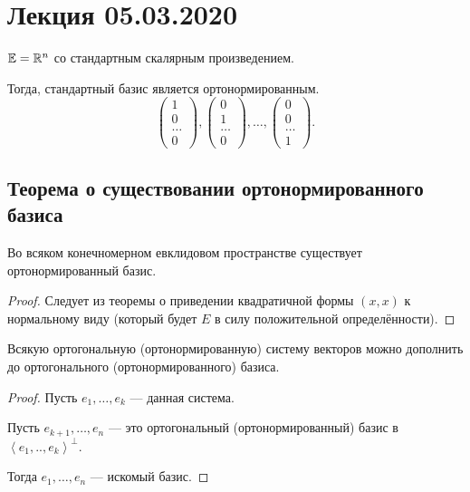 \section{Лекция 05.03.2020}

\begin{example}
    $\mathbb{E} = \mathbb{R}^n$ со стандартным скалярным произведением.

    Тогда, стандартный базис является ортонормированным.
    \begin{equation*}
        \begin{pmatrix} 1 \\ 0 \\ \dots \\ 0 \end{pmatrix},
        \begin{pmatrix} 0 \\ 1 \\ \dots \\ 0 \end{pmatrix},
        \dots,
        \begin{pmatrix} 0 \\ 0 \\ \dots \\ 1 \end{pmatrix}
    .\end{equation*}
\end{example}


\subsection{Теорема о существовании ортонормированного базиса}

\begin{theorem}
    Во всяком конечномерном евклидовом пространстве существует ортонормированный базис.
\end{theorem}

\begin{proof}
    Следует из теоремы о приведении квадратичной формы $(x, x)$ к нормальному виду (который будет $E$ в силу положительной определённости).
\end{proof}

\begin{corollary}
    Всякую ортогональную (ортонормированную) систему векторов можно дополнить до ортогонального (ортонормированного) базиса.
\end{corollary}

\begin{proof}
    Пусть $e_1, \dots, e_k$ --- данная система. 

    Пусть $e_{k + 1}, \dots, e_{n}$ --- это ортогональный (ортонормированный) базис в $\left< e_1, .., e_k \right>^{\perp}$.

    Тогда $e_1, \dots, e_n$ --- искомый базис.
\end{proof}


